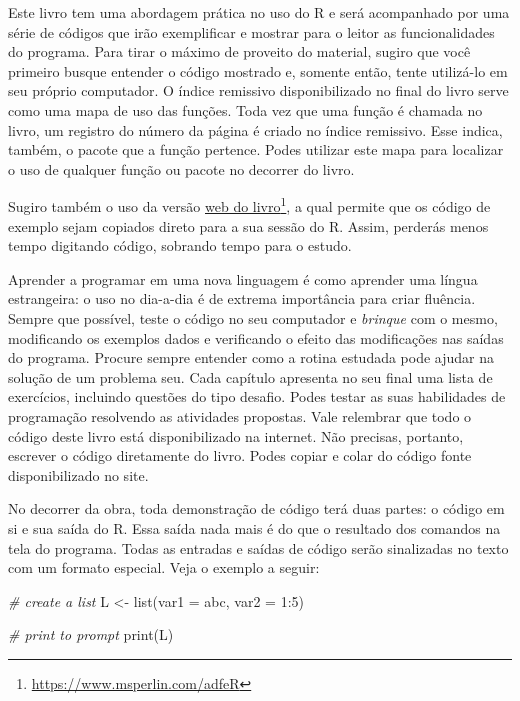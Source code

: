\documentclass[
  11pt,
]{book}
\newenvironment{Shaded}{\begin{snugshade}}{\end{snugshade}}
\newcommand{\AttributeTok}[1]{\textcolor[rgb]{0.61,0.61,0.61}{#1}}
\newcommand{\CommentTok}[1]{\textcolor[rgb]{0.37,0.37,0.37}{\textit{#1}}}
\newcommand{\DecValTok}[1]{\textcolor[rgb]{0.06,0.06,0.06}{#1}}
\newcommand{\FunctionTok}[1]{\textcolor[rgb]{0,0,0}{#1}}
\newcommand{\NormalTok}[1]{#1}
\newcommand{\OtherTok}[1]{\textcolor[rgb]{0.37,0.37,0.37}{#1}}
\newcommand{\SpecialCharTok}[1]{\textcolor[rgb]{0,0,0}{#1}}
\newcommand{\StringTok}[1]{\textcolor[rgb]{0.5,0.5,0.5}{#1}}
\begin{document}
Este livro tem uma abordagem prática no uso do R e será acompanhado por uma série de códigos que irão exemplificar e mostrar para o leitor as funcionalidades do programa. Para tirar o máximo de proveito do material, sugiro que você primeiro busque entender o código mostrado e, somente então, tente utilizá-lo em seu próprio computador. O índice remissivo disponibilizado no final do livro serve como uma mapa de uso das funções. Toda vez que uma função é chamada no livro, um registro do número da página é criado no índice remissivo. Esse indica, também, o pacote que a função pertence. Podes utilizar este mapa para localizar o uso de qualquer função ou pacote no decorrer do livro.

Sugiro também o uso da versão \href{https://www.msperlin.com/adfeR}{web do livro}\footnote{\url{https://www.msperlin.com/adfeR}}, a qual permite que os código de exemplo sejam copiados direto para a sua sessão do R. Assim, perderás menos tempo digitando código, sobrando tempo para o estudo.

Aprender a programar em uma nova linguagem é como aprender uma língua estrangeira: o uso no dia-a-dia é de extrema importância para criar fluência. Sempre que possível, teste o código no seu computador e \emph{brinque} com o mesmo, modificando os exemplos dados e verificando o efeito das modificações nas saídas do programa. Procure sempre entender como a rotina estudada pode ajudar na solução de um problema seu. Cada capítulo apresenta no seu final uma lista de exercícios, incluindo questões do tipo desafio. Podes testar as suas habilidades de programação resolvendo as atividades propostas. Vale relembrar que todo o código deste livro está disponibilizado na internet. Não precisas, portanto, escrever o código diretamente do livro. Podes copiar e colar do código fonte disponibilizado no site.

No decorrer da obra, toda demonstração de código terá duas partes: o código em si e sua saída do R. Essa saída nada mais é do que o resultado dos comandos na tela do programa. Todas as entradas e saídas de código serão sinalizadas no texto com um formato especial. Veja o exemplo a seguir:

\begin{Shaded}
\begin{Highlighting}[]
\CommentTok{\# create a list}
\NormalTok{L }\OtherTok{\textless{}{-}} \FunctionTok{list}\NormalTok{(}\AttributeTok{var1 =} \StringTok{\textquotesingle{}abc\textquotesingle{}}\NormalTok{, }\AttributeTok{var2 =} \DecValTok{1}\SpecialCharTok{:}\DecValTok{5}\NormalTok{)}

\CommentTok{\# print to prompt}
\FunctionTok{print}\NormalTok{(L)}
\end{Highlighting}
\end{Shaded}
\end{document}
